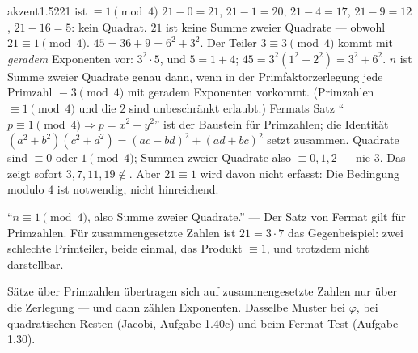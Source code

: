 \begin{loesungkarte}{akzent}{1.52}{21 ist $\equiv1\pmod4$}
$21 - 0 = 21$, $21 - 1 = 20$, $21 - 4 = 17$, $21 - 9 = 12$, $21 - 16 = 5$: kein Quadrat. $21$ ist keine Summe zweier Quadrate --- obwohl $21\equiv1\pmod4$.
$45 = 36 + 9 = 6^{2} + 3^{2}$. Der Teiler $3\equiv3\pmod4$ kommt mit \emph{geradem} Exponenten vor: $3^{2}\cdot5$, und $5 = 1 + 4$; $45 = 3^{2}(1^{2} + 2^{2}) = 3^{2} + 6^{2}$.
$n$ ist Summe zweier Quadrate genau dann, wenn in der Primfaktorzerlegung jede Primzahl $\equiv3\pmod4$ mit geradem Exponenten vorkommt. (Primzahlen $\equiv1\pmod4$ und die $2$ sind unbeschränkt erlaubt.) Fermats Satz \enquote{$p\equiv1\pmod4\Rightarrow p = x^{2} + y^{2}$} ist der Baustein für Primzahlen; die Identität $(a^{2} + b^{2})(c^{2} + d^{2}) = (ac - bd)^{2} + (ad + bc)^{2}$ setzt zusammen.
Quadrate sind $\equiv0$ oder $1\pmod4$; Summen zweier Quadrate also $\equiv0, 1, 2$ --- nie $3$. Das zeigt sofort $3, 7, 11, 19\notin$. Aber $21\equiv1$ wird davon nicht erfasst: Die Bedingung modulo $4$ ist notwendig, nicht hinreichend.
\begin{fehler}\kastentext
\enquote{$n\equiv1\pmod4$, also Summe zweier Quadrate.} --- Der Satz von Fermat gilt für Primzahlen. Für zusammengesetzte Zahlen ist $21 = 3\cdot7$ das Gegenbeispiel: zwei schlechte Primteiler, beide einmal, das Produkt $\equiv1$, und trotzdem nicht darstellbar.
\end{fehler}
\begin{mitnehmen}\kastentext
Sätze über Primzahlen übertragen sich auf zusammengesetzte Zahlen nur über die Zerlegung --- und dann zählen Exponenten. Dasselbe Muster bei $\varphi$, bei quadratischen Resten (Jacobi, Aufgabe 1.40c) und beim Fermat-Test (Aufgabe 1.30).
\end{mitnehmen}
\end{loesungkarte}


